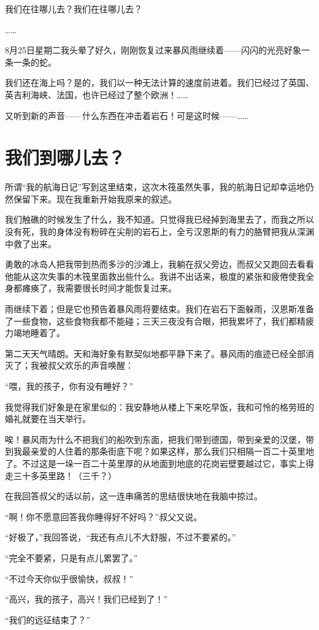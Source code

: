 \documentclass[10pt]{book}
\begin{document}
我们在往哪儿去？我们在往哪儿去？

……

8月25日星期二我头晕了好久，刚刚恢复过来暴风雨继续着——闪闪的光亮好象一条一条的蛇。

我们还在海上吗？是的，我们以一种无法计算的速度前进着。我们已经过了英国、英吉利海峡、法国，也许已经过了整个欧洲！……

又听到新的声音——什么东西在冲击着岩石！可是这时候——……
\chapter{我们到哪儿去？}
所谓“我的航海日记”写到这里结束，这次木筏虽然失事，我的航海日记却幸运地仍然保留下来。现在我重新开始我原来的叙述。

我们触礁的时候发生了什么，我不知道。只觉得我已经掉到海里去了，而我之所以没有死，我的身体没有粉碎在尖削的岩石上，全亏汉恩斯的有力的胳臂把我从深渊中救了出来。

勇敢的冰岛人把我带到热而多沙的沙滩上，我躺在叔父旁边，而叔父又跑回去看看他能从这次失事的木筏里面救出些什么。我讲不出话来，极度的紧张和疲倦使我全身都瘫痪了，我需要很长时间才能恢复过来。

雨继续下着；但是它也预告着暴风雨将要结束。我们在岩石下面躲雨，汉恩斯准备了一些食物，这些食物我都不能碰；三天三夜没有合眼，把我累坏了，我们都精疲力竭地睡着了。

第二天天气晴朗。天和海好象有默契似地都平静下来了。暴风雨的痕迹已经全部消灭了；我被叔父欢乐的声音唤醒：

“喂，我的孩子，你有没有睡好？”

我觉得我们好象是在家里似的：我安静地从楼上下来吃早饭，我和可怜的格劳班的婚礼就要在当天举行。

唉！暴风雨为什么不把我们的船吹到东面，把我们带到德国，带到亲爱的汉堡，带到我最亲爱的人住着的那条街底下呢？如果这样，那么我们只相隔一百二十英里地了。不过这是一垛一百二十英里厚的从地面到地底的花岗岩壁要越过它，事实上得走三十多英里路！（三千？）

在我回答叔父的话以前，这一连串痛苦的思结很快地在我脑中掠过。

“啊！你不愿意回答我你睡得好不好吗？”叔父又说。

“好极了，”我回答说，“我还有点儿不大舒服，不过不要紧的。”

“完全不要紧，只是有点儿累罢了。”

“不过今天你似乎很愉快，叔叔！”

“高兴，我的孩子，高兴！我们已经到了！”

“我们的远征结束了？”
\end{document}
